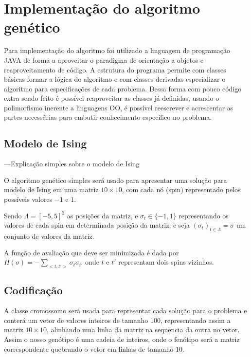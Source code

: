 
\chapter{Implementação do algoritmo genético}
\label{chap:implementGA}

Para implementação do algoritmo foi utilizado a linguagem de programação JAVA de forma a aproveitar o paradigma de orientação a objetos e reaproveitamento de código. A estrutura do programa permite com classes básicas formar a lógica do algoritmo e com classes derivadas especializar o algoritmo para especificações de cada problema. Dessa forma com pouco código extra sendo feito é possível reaproveitar as classes já definidas, usando o polimorfismo inerente a linguagens OO, é possível reescrever e acrescentar as partes necessárias para embutir conhecimento específico no problema.

\section{Modelo de Ising}

---Explicação simples sobre o modelo de Ising

O algoritmo genético simples será usado para apresentar uma solução para modelo de Ising em uma matriz \(10 \times 10\), com cada nó (spin) representado pelos possíveis valores $-1$ e $1$. 

Sendo \(\Lambda = \left[-5,5\right]^2\) as posições da matriz, e \(\sigma_t \in \{-1,1\}\) representando os valores de cada spin em determinada posição da matriz, e seja \( (\sigma_t)_{t \in \Lambda} = \sigma \) um conjunto de valores da matriz. 

A função de avaliação que deve ser minimizada é dada por \( H(\sigma) = -\sum_{<t,t'>}\sigma_t \sigma_{t'} \) onde $t$ e $t'$ representam dois spins vizinhos.   

\section{Codificação}

A classe cromossomo será usada para representar cada solução para o problema e conterá um vetor de valores inteiros de tamanho $100$, representando assim a matriz \( 10 \times 10 \), alinhando uma linha da matriz na sequencia da outra no vetor. Assim o nosso genótipo é uma cadeia de inteiros, onde o fenótipo será a matriz correspondente quebrando o vetor em linhas de tamanho $10$.

